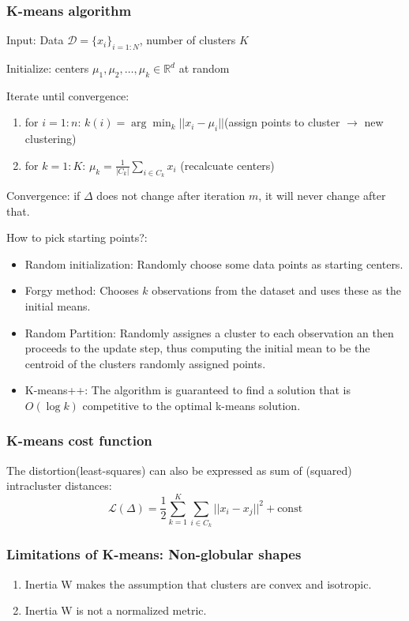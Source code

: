 \subsubsection{K-means algorithm}
Input: Data \(\mathcal{D} = \{x_i\}_{i = 1:N}\), number of clusters \(K\)

Initialize: centers \(\mu_1,\mu_2,\dots,\mu_k \in \mathbb{R}^d\) at random

Iterate until convergence:
\begin{enumerate}
    \item for \(i = 1:n\): \(k(i) = \arg\min_k||x_i-\mu_i||\)(assign points to cluster \(\rightarrow\) new clustering)
    
    \item for \(k = 1:K\): \(\mu_k = \frac{1}{|C_k|}\sum_{i \in C_k}x_i\) (recalcuate centers)
\end{enumerate}
Convergence: if \(\Delta\) does not change after iteration \(m\), it will never change after that.

How to pick starting points?:
\begin{itemize}
    \item Random initialization: Randomly choose some data points as starting centers.
    \item Forgy method: Chooses \(k\) observations from the dataset and uses these as the initial means.
    \item Random Partition: Randomly assignes a cluster to each observation an then proceeds to the update step, thus computing the initial mean to be the centroid of the clusters randomly assigned points.
    \item K-means++: The algorithm is guaranteed to find a solution that is \(O(\log k)\) competitive to the optimal k-means solution.
\end{itemize}
\subsubsection{K-means cost function}
The distortion(least-squares) can also be expressed as sum of (squared) intracluster distances:
\[
\mathcal{L}(\Delta) = \frac{1}{2}\sum_{k = 1}^K\sum_{i\in C_k}||x_i - x_j||^2 + \text{const}
\]
\subsubsection{Limitations of K-means: Non-globular shapes}
\begin{enumerate}
    \item Inertia W makes the assumption that clusters are convex and isotropic.
    \item Inertia W is not a normalized metric.
\end{enumerate}
